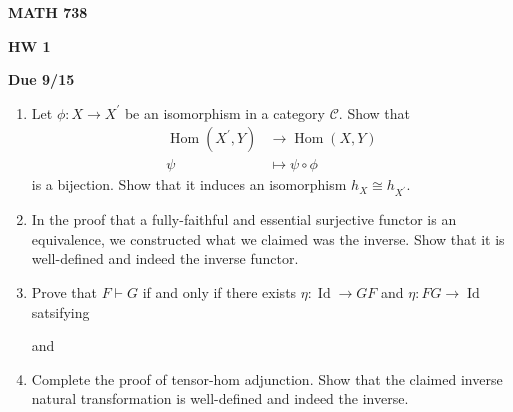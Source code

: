 \documentclass[12pt]{amsart}
\begin{document}
\centerline{\bf MATH 738}
\centerline{\bf HW 1} 
\centerline{\bf Due 9/15}

\vspace{2em}


\begin{enumerate}
    
    \item Let $\phi : X \to X^\prime$ be an isomorphism in a category $\mathcal C$. Show that 
    \begin{align*}
        \operatorname{Hom}(X^\prime,Y) & \to \operatorname{Hom}(X,Y) \\
        \psi & \mapsto \psi \circ \phi
    \end{align*}
    is a bijection. Show that it induces an isomorphism $h_X \cong h_{X^\prime}$. 

    \item In the proof that a fully-faithful and essential surjective functor is an equivalence, we 
    constructed what we claimed was the inverse. Show that it is well-defined and indeed the inverse functor. 

    \item Prove that $F \vdash G$ if and only if there exists $\eta : \operatorname{Id} \to GF$ and $\eta 
    : FG \to \operatorname{Id}$ satsifying 
    \begin{center}
    \end{center}
    and 
    \begin{center}
    \end{center}

    \item Complete the proof of tensor-hom adjunction. Show that the claimed inverse natural transformation is 
    well-defined and indeed the inverse. 

\end{enumerate}
\end{document}
